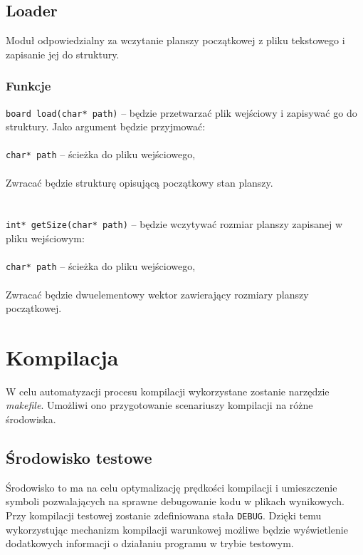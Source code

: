 \documentclass{article}
\begin{document}
\subsection{Loader}
Moduł odpowiedzialny za wczytanie planszy początkowej z pliku tekstowego i zapisanie jej do struktury.

\subsubsection{Funkcje}
\texttt{board load(char* path)} -- będzie przetwarzać plik wejściowy i zapisywać go do struktury. Jako argument będzie przyjmować:\\\\
	 \hspace*{10mm}\texttt{char* path} -- ścieżka do pliku wejściowego,\\
\\
Zwracać będzie strukturę opisującą początkowy stan planszy.\\\\
\\
\texttt{int* getSize(char* path)} -- będzie wczytywać rozmiar planszy zapisanej w pliku wejściowym:\\\\ %
	 \hspace*{10mm}\texttt{char* path} -- ścieżka do pliku wejściowego,\\
\\
Zwracać będzie dwuelementowy wektor zawierający rozmiary planszy początkowej.

\section{Kompilacja}
W celu automatyzacji procesu kompilacji wykorzystane zostanie narzędzie \textit{makefile}. Umożliwi ono przygotowanie scenariuszy kompilacji na różne środowiska.

\subsection{Środowisko testowe}
Środowisko to ma na celu optymalizację prędkości kompilacji i umieszczenie symboli pozwalających na sprawne debugowanie kodu w plikach wynikowych. Przy kompilacji testowej zostanie zdefiniowana stała \texttt{DEBUG}. Dzięki temu wykorzystując mechanizm kompilacji warunkowej możliwe będzie wyświetlenie dodatkowych informacji o działaniu programu w trybie testowym.
\end{document}
